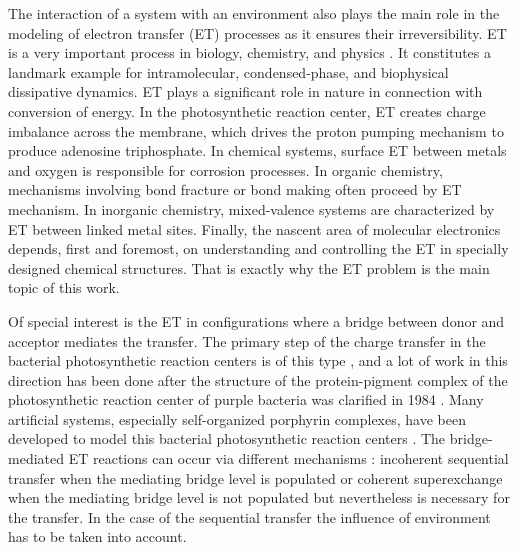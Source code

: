 \documentclass[12pt,twoside,a4paper]{report}
\begin{document}
The interaction of a system with an environment also plays the main role in 
the modeling of electron transfer (ET) processes as it ensures their 
irreversibility. ET is a very important process in biology, chemistry, and 
physics \cite{jort99,d1,b8,n11,b1}. It constitutes a 
landmark 
example for 
intramolecular, condensed-phase, and biophysical dissipative dynamics. ET 
plays a significant role  in nature in connection with conversion of energy. In the 
photosynthetic reaction center, 
ET  creates charge imbalance across 
the membrane, which drives the proton pumping mechanism to produce 
adenosine triphosphate. 
In chemical systems, surface ET between metals and oxygen is responsible for 
corrosion processes. In organic chemistry, mechanisms involving bond 
fracture or bond making often proceed by ET mechanism. In inorganic 
chemistry, mixed-valence systems are characterized by ET between linked 
metal sites. Finally, the nascent area of molecular electronics depends, 
first and foremost, on understanding and controlling the ET in specially
designed 
chemical structures. 
That is exactly why  
the ET problem 
is the main topic of this work.
 
Of special interest is the ET in   
configurations where a bridge between donor 
and acceptor mediates the transfer. 
The primary step of the  charge transfer in 
the bacterial photosynthetic reaction centers is of this type \cite{bixo91},
and 
a lot of work in this direction has been done after the structure of the 
protein-pigment complex of the photosynthetic reaction center of purple 
bacteria was clarified in 1984 \cite{deis84}. Many artificial systems, 
especially self-organized porphyrin complexes, have been developed to model 
this bacterial photosynthetic reaction centers \cite{b8,w1,j1}. 
The bridge-mediated ET reactions can occur via different mechanisms
\cite{n11,d2,skou95,schr98b}: 
incoherent sequential transfer when the mediating 
bridge level is populated or coherent superexchange \cite{m6,k8} when
the mediating bridge level is not populated but nevertheless is necessary for 
the transfer. In the case of the sequential transfer the influence 
of  environment
has to be taken into account.
 
\end{document}
